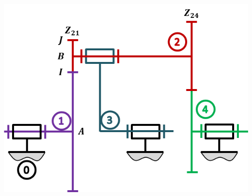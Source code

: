 \documentclass[10pt,fleqn]{article} %
\begin{document}
\begin{multicols}{2}
\vspace{1cm}

\begin{center}
\includegraphics[width=\linewidth]{images/train_04}
\end{center}
%
%
%
%
%
%

\end{multicols}
\end{document}
